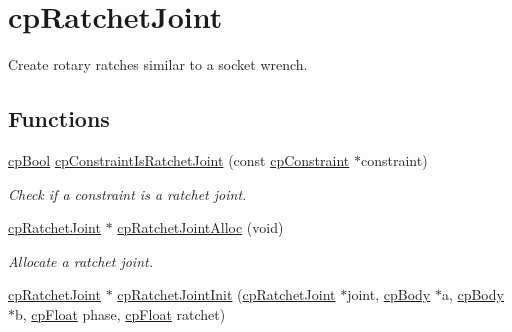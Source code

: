 \hypertarget{group__cp_ratchet_joint}{}\section{cp\+Ratchet\+Joint}
\label{group__cp_ratchet_joint}


Create rotary ratches similar to a socket wrench.  


\subsection*{Functions}
\begin{DoxyCompactItemize}
\item 
\hypertarget{group__cp_ratchet_joint_ga9c61fdc92676bcea42f36ed6de579ed5}{}\hyperlink{group__basic_types_gabc5e752c48f3449ca26ef413ecbd647e}{cp\+Bool} \hyperlink{group__cp_ratchet_joint_ga9c61fdc92676bcea42f36ed6de579ed5}{cp\+Constraint\+Is\+Ratchet\+Joint} (const \hyperlink{structcp_constraint}{cp\+Constraint} $\ast$constraint)\label{group__cp_ratchet_joint_ga9c61fdc92676bcea42f36ed6de579ed5}

\begin{DoxyCompactList}\small\item\em Check if a constraint is a ratchet joint. \end{DoxyCompactList}\item 
\hypertarget{group__cp_ratchet_joint_gadee71c6fb85f91900f4aea640269c7a4}{}\hyperlink{structcp_ratchet_joint}{cp\+Ratchet\+Joint} $\ast$ \hyperlink{group__cp_ratchet_joint_gadee71c6fb85f91900f4aea640269c7a4}{cp\+Ratchet\+Joint\+Alloc} (void)\label{group__cp_ratchet_joint_gadee71c6fb85f91900f4aea640269c7a4}

\begin{DoxyCompactList}\small\item\em Allocate a ratchet joint. \end{DoxyCompactList}\item 
\hypertarget{group__cp_ratchet_joint_ga712d5ebfd8200a2baaf99640d844224f}{}\hyperlink{structcp_ratchet_joint}{cp\+Ratchet\+Joint} $\ast$ \hyperlink{group__cp_ratchet_joint_ga712d5ebfd8200a2baaf99640d844224f}{cp\+Ratchet\+Joint\+Init} (\hyperlink{structcp_ratchet_joint}{cp\+Ratchet\+Joint} $\ast$joint, \hyperlink{structcp_body}{cp\+Body} $\ast$a, \hyperlink{structcp_body}{cp\+Body} $\ast$b, \hyperlink{group__basic_types_gac1ed65573e035bf892505768c852d8d3}{cp\+Float} phase, \hyperlink{group__basic_types_gac1ed65573e035bf892505768c852d8d3}{cp\+Float} ratchet)\label{group__cp_ratchet_joint_ga712d5ebfd8200a2baaf99640d844224f}


\end{DoxyCompactItemize}
